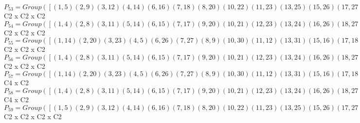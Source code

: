 \documentclass[varwidth=\maxdimen,border=10]{standalone}
\begin{document}
\begin{tabular}
$P_{53} = Group( [ ( 1, 5)( 2, 9)( 3,12)( 4,14)( 6,16)( 7,18)( 8,20)(10,22)(11,23)(13,25)(15,26)(17,27)(19,29)(21,30)(24,31)(28,32), ( 1, 6)( 2,10)( 3,13)( 4,15)( 5,16)( 7,19)( 8,21)( 9,22)(11,24)(12,25)(14,26)(17,28)(18,29)(20,30)(23,31)(27,32), ( 1, 4)( 2, 8)( 3,11)( 5,14)( 6,15)( 7,17)( 9,20)(10,21)(12,23)(13,24)(16,26)(18,27)(19,28)(22,30)(25,31)(29,32) ] )\cong$ C2 x C2 x C2\ \\
$P_{54} = Group( [ ( 1, 4)( 2, 8)( 3,11)( 5,14)( 6,15)( 7,17)( 9,20)(10,21)(12,23)(13,24)(16,26)(18,27)(19,28)(22,30)(25,31)(29,32), ( 1, 3)( 2, 7)( 4,11)( 5,12)( 6,13)( 8,17)( 9,18)(10,19)(14,23)(15,24)(16,25)(20,27)(21,28)(22,29)(26,31)(30,32), ( 1, 6)( 2,10)( 3,13)( 4,15)( 5,16)( 7,19)( 8,21)( 9,22)(11,24)(12,25)(14,26)(17,28)(18,29)(20,30)(23,31)(27,32) ] )\cong$ C2 x C2 x C2\ \\
$P_{55} = Group( [ ( 1,14)( 2,20)( 3,23)( 4, 5)( 6,26)( 7,27)( 8, 9)(10,30)(11,12)(13,31)(15,16)(17,18)(19,32)(21,22)(24,25)(28,29), ( 1, 3)( 2, 7)( 4,11)( 5,12)( 6,13)( 8,17)( 9,18)(10,19)(14,23)(15,24)(16,25)(20,27)(21,28)(22,29)(26,31)(30,32), ( 1, 6)( 2,10)( 3,13)( 4,15)( 5,16)( 7,19)( 8,21)( 9,22)(11,24)(12,25)(14,26)(17,28)(18,29)(20,30)(23,31)(27,32) ] )\cong$ C2 x C2 x C2\ \\
$P_{56} = Group( [ ( 1, 4)( 2, 8)( 3,11)( 5,14)( 6,15)( 7,17)( 9,20)(10,21)(12,23)(13,24)(16,26)(18,27)(19,28)(22,30)(25,31)(29,32), ( 1, 3)( 2, 7)( 4,11)( 5,12)( 6,13)( 8,17)( 9,18)(10,19)(14,23)(15,24)(16,25)(20,27)(21,28)(22,29)(26,31)(30,32), ( 1, 5)( 2, 9)( 3,12)( 4,14)( 6,16)( 7,18)( 8,20)(10,22)(11,23)(13,25)(15,26)(17,27)(19,29)(21,30)(24,31)(28,32) ] )\cong$ C2 x C2 x C2\ \\
$P_{57} = Group( [ ( 1,14)( 2,20)( 3,23)( 4, 5)( 6,26)( 7,27)( 8, 9)(10,30)(11,12)(13,31)(15,16)(17,18)(19,32)(21,22)(24,25)(28,29), ( 1, 2, 6,10)( 3,18,13,29)( 4, 8,15,21)( 5, 9,16,22)( 7,25,19,12)(11,27,24,32)(14,20,26,30)(17,31,28,23), ( 1, 6)( 2,10)( 3,13)( 4,15)( 5,16)( 7,19)( 8,21)( 9,22)(11,24)(12,25)(14,26)(17,28)(18,29)(20,30)(23,31)(27,32) ] )\cong$ C4 x C2\ \\
$P_{58} = Group( [ ( 1, 4)( 2, 8)( 3,11)( 5,14)( 6,15)( 7,17)( 9,20)(10,21)(12,23)(13,24)(16,26)(18,27)(19,28)(22,30)(25,31)(29,32), ( 1, 2, 6,10)( 3,18,13,29)( 4, 8,15,21)( 5, 9,16,22)( 7,25,19,12)(11,27,24,32)(14,20,26,30)(17,31,28,23), ( 1, 6)( 2,10)( 3,13)( 4,15)( 5,16)( 7,19)( 8,21)( 9,22)(11,24)(12,25)(14,26)(17,28)(18,29)(20,30)(23,31)(27,32) ] )\cong$ C4 x C2\ \\
$P_{59} = Group( [ ( 1, 5)( 2, 9)( 3,12)( 4,14)( 6,16)( 7,18)( 8,20)(10,22)(11,23)(13,25)(15,26)(17,27)(19,29)(21,30)(24,31)(28,32), ( 1, 6)( 2,10)( 3,13)( 4,15)( 5,16)( 7,19)( 8,21)( 9,22)(11,24)(12,25)(14,26)(17,28)(18,29)(20,30)(23,31)(27,32), ( 1, 4)( 2, 8)( 3,11)( 5,14)( 6,15)( 7,17)( 9,20)(10,21)(12,23)(13,24)(16,26)(18,27)(19,28)(22,30)(25,31)(29,32), ( 1, 3)( 2, 7)( 4,11)( 5,12)( 6,13)( 8,17)( 9,18)(10,19)(14,23)(15,24)(16,25)(20,27)(21,28)(22,29)(26,31)(30,32) ] )\cong$ C2 x C2 x C2 x C2\ \\

\end{tabular}
\end{document}
